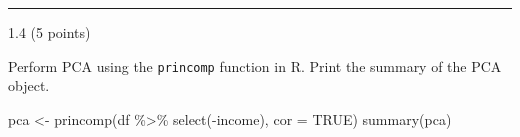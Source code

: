 \documentclass[
  letterpaper,
  DIV=11,
  numbers=noendperiod]{scrartcl}
\newenvironment{Shaded}{\begin{snugshade}}{\end{snugshade}}
\newcommand{\AttributeTok}[1]{\textcolor[rgb]{0.40,0.45,0.13}{#1}}
\newcommand{\ConstantTok}[1]{\textcolor[rgb]{0.56,0.35,0.01}{#1}}
\newcommand{\FunctionTok}[1]{\textcolor[rgb]{0.28,0.35,0.67}{#1}}
\newcommand{\NormalTok}[1]{\textcolor[rgb]{0.00,0.23,0.31}{#1}}
\newcommand{\OtherTok}[1]{\textcolor[rgb]{0.00,0.23,0.31}{#1}}
\newcommand{\SpecialCharTok}[1]{\textcolor[rgb]{0.37,0.37,0.37}{#1}}
\begin{document}
\begin{center}\rule{0.5\linewidth}{0.5pt}\end{center}

1.4 (5 points)

Perform PCA using the \texttt{princomp} function in R. Print the summary
of the PCA object.

\begin{Shaded}
\begin{Highlighting}[]
\NormalTok{pca }\OtherTok{\textless{}{-}} \FunctionTok{princomp}\NormalTok{(df }\SpecialCharTok{\%\textgreater{}\%} \FunctionTok{select}\NormalTok{(}\SpecialCharTok{{-}}\NormalTok{income), }\AttributeTok{cor =} \ConstantTok{TRUE}\NormalTok{)}
\FunctionTok{summary}\NormalTok{(pca)}
\end{Highlighting}
\end{Shaded}
\end{document}
